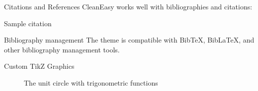 \documentclass[aspectratio=169,xcolor=dvipsnames]{beamer}
\begin{document}
\begin{frame}{Citations and References}
  CleanEasy works well with bibliographies and citations:
  
  \begin{block}{Sample citation}
  \end{block}
  
  \begin{exampleblock}{Bibliography management}
    The theme is compatible with BibTeX, BibLaTeX, and other bibliography management tools.
  \end{exampleblock}
  
\end{frame}

\begin{frame}{Custom TikZ Graphics}

  \begin{figure}
      \centering
      \caption{The unit circle with trigonometric functions}
      \label{fig:exampleTikz}
  \end{figure}
\end{frame}
\end{document}
